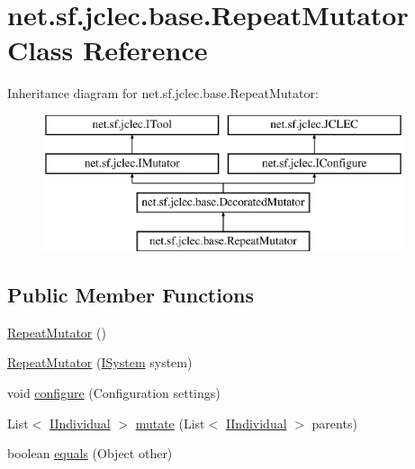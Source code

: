\hypertarget{classnet_1_1sf_1_1jclec_1_1base_1_1_repeat_mutator}{\section{net.\-sf.\-jclec.\-base.\-Repeat\-Mutator Class Reference}
\label{classnet_1_1sf_1_1jclec_1_1base_1_1_repeat_mutator}
}
Inheritance diagram for net.\-sf.\-jclec.\-base.\-Repeat\-Mutator\-:\begin{figure}[H]
\begin{center}
\leavevmode
\includegraphics[height=4.000000cm]{classnet_1_1sf_1_1jclec_1_1base_1_1_repeat_mutator}
\end{center}
\end{figure}
\subsection*{Public Member Functions}
\begin{DoxyCompactItemize}
\item 
\hyperlink{classnet_1_1sf_1_1jclec_1_1base_1_1_repeat_mutator_ad136f8c5cca81020bb6603916f0f6735}{Repeat\-Mutator} ()
\item 
\hyperlink{classnet_1_1sf_1_1jclec_1_1base_1_1_repeat_mutator_a6df40caad8fc4fb35b1ab0c3dac507fc}{Repeat\-Mutator} (\hyperlink{interfacenet_1_1sf_1_1jclec_1_1_i_system}{I\-System} system)
\item 
void \hyperlink{classnet_1_1sf_1_1jclec_1_1base_1_1_repeat_mutator_a7ab450ee589ea9a712e16e580cec514e}{configure} (Configuration settings)
\item 
List$<$ \hyperlink{interfacenet_1_1sf_1_1jclec_1_1_i_individual}{I\-Individual} $>$ \hyperlink{classnet_1_1sf_1_1jclec_1_1base_1_1_repeat_mutator_acf19b510827aecd43c4520430120d163}{mutate} (List$<$ \hyperlink{interfacenet_1_1sf_1_1jclec_1_1_i_individual}{I\-Individual} $>$ parents)
\item 
boolean \hyperlink{classnet_1_1sf_1_1jclec_1_1base_1_1_repeat_mutator_affce022ad0e96022d6afaf0b331c5982}{equals} (Object other)
\end{DoxyCompactItemize}
